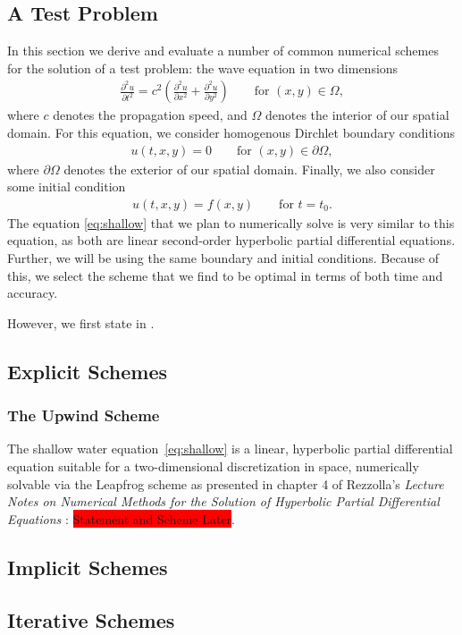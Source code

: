 \documentclass[../main.tex]{subfiles}
\begin{document}
\subsection{A Test Problem}
In this section we derive and evaluate a number of common numerical schemes for the solution of a test problem: the wave equation in two dimensions
\begin{gather}\label{eq:wave}
    \frac{\partial^2 u}{\partial t^2} = c^2\left(\frac{\partial^2 u}{\partial x^2} + \frac{\partial^2 u}{\partial y^2} \right)\qquad\text{for }(x,y)\in\Omega,
\end{gather}
where $c$ denotes the propagation speed, and $\Omega$ denotes the interior of our spatial domain. For this equation, we consider homogenous Dirchlet boundary conditions
\begin{gather}\label{eq:bcs}
    u(t,x,y) = 0\qquad\text{for }(x,y)\in\partial\Omega,
\end{gather}
where $\partial\Omega$ denotes the exterior of our spatial domain. Finally, we also consider some initial condition
\begin{gather}\label{eq:ic}
    u(t,x,y) = f(x,y)\qquad\text{for }t=t_0.
\end{gather}
The equation \ref{eq:shallow}  that we plan to numerically solve is very similar to this equation, as both are linear second-order hyperbolic partial differential equations. Further, we will be using the same boundary and initial conditions. Because of this, we select the scheme that we find to be optimal in terms of both time and accuracy.

\noindent However, we first state \label{eq:wave} in .

\subsection{Explicit Schemes}
\subsubsection{The Upwind Scheme}


The shallow water equation~\ref{eq:shallow} is a linear, hyperbolic partial differential equation suitable for a two-dimensional discretization in space, numerically solvable via the Leapfrog scheme as presented in chapter 4 of Rezzolla's \textit{Lecture Notes on Numerical Methods for the Solution of Hyperbolic Partial Differential Equations} \cite{rezzolla}: \colorbox{red}{Statement and Scheme Later}.
\subsection{Implicit Schemes}

\subsection{Iterative Schemes}
\end{document}
